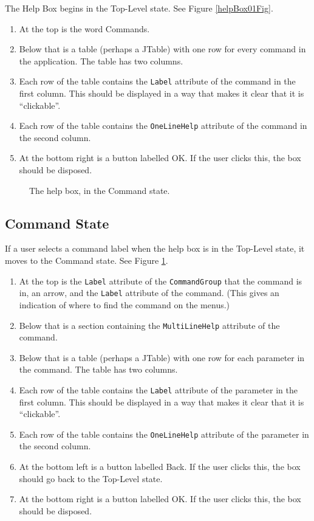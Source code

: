 \documentclass[11pt]{article}
\begin{document}
The Help Box begins in the Top-Level state.
See Figure \ref{helpBox01Fig}.
\begin{enumerate}
\item At the top is the word Commands.
\item Below that is a table (perhaps a JTable) with one row
  for every command in the application.  The table has two columns.
\item Each row of the table contains the {\tt Label} attribute of
  the command in the first column.  This should be displayed in a
  way that makes it clear that it is ``clickable''.
\item Each row of the table contains the {\tt OneLineHelp} attribute of
  the command in the second column.
\item At the bottom right is a button labelled OK.  If the user
  clicks this, the box should be disposed.
\end{enumerate}

\begin{figure}

\centerline{\epsfxsize=4in }

\caption{
  The help box, in the Command state.
}
\label{helpBox02Fig}
\end{figure}

\subsection{Command State}

If a user selects a command label when the help box is in the
Top-Level state, it moves to the Command state.
See Figure \ref{helpBox02Fig}.
\begin{enumerate}
\item At the top is the {\tt Label} attribute of the {\tt CommandGroup}
  that the command is in, an arrow, and the {\tt Label} attribute of the
  command.  (This gives an indication of where to find the command
  on the menus.)
\item Below that is a section containing the {\tt MultiLineHelp} attribute
  of the command.
\item Below that is a table (perhaps a JTable) with one row for each
  parameter in the command.  The table has two columns.
\item Each row of the table contains the {\tt Label} attribute of
  the parameter in the first column.  This should be displayed in a
  way that makes it clear that it is ``clickable''.
\item Each row of the table contains the {\tt OneLineHelp} attribute of
  the parameter in the second column.
\item At the bottom left is a button labelled Back.  If the user
  clicks this, the box should go back to the Top-Level state.
\item At the bottom right is a button labelled OK.  If the user
  clicks this, the box should be disposed.
\end{enumerate}
\end{document}
